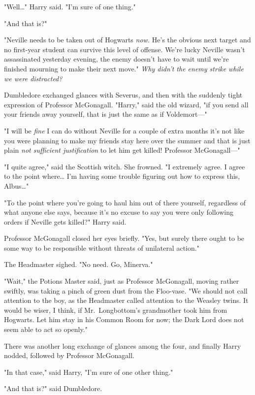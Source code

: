 "Well{\ldots}" Harry said. "I'm sure of one thing."

"And that is?"

"Neville needs to be taken out of Hogwarts \emph{now.} He's the obvious next
target and no first-year student can survive this level of offense. We're lucky
Neville wasn't assassinated yesterday evening, the enemy doesn't have to wait
until we're finished mourning to make their next move." \emph{Why didn't the
enemy strike while we were distracted?}

Dumbledore exchanged glances with Severus, and then with the suddenly tight
expression of Professor McGonagall. "Harry," said the old wizard, "if you send
all your friends away yourself, that is just the same as if Voldemort---"

"I will be \emph{fine} I can do without Neville for a couple of extra months
it's not like you were planning to make my friends stay here over the summer
and that is just plain \emph{not sufficient justification} to let him get
killed! Professor McGonagall---"

"I quite agree," said the Scottish witch. She frowned. "I extremely agree. I
agree to the point where{\ldots} I'm having some trouble figuring out how to
express this, Albus{\ldots}"

"To the point where you're going to haul him out of there yourself, regardless
of what anyone else says, because it's no excuse to say you were only following
orders if Neville gets killed?" Harry said.

Professor McGonagall closed her eyes briefly. "Yes, but surely there ought to
be some way to be responsible without threats of unilateral action."

The Headmaster sighed. "No need. Go, Minerva."

"Wait," the Potions Master said, just as Professor McGonagall, moving rather
swiftly, was taking a pinch of green dust from the Floo-vase. "We should not
call attention to the boy, as the Headmaster called attention to the Weasley
twins. It would be wiser, I think, if Mr.~Longbottom's grandmother took him
from Hogwarts. Let him stay in his Common Room for now; the Dark Lord does not
seem able to act so openly."

There was another long exchange of glances among the four, and finally Harry
nodded, followed by Professor McGonagall.

"In that case," said Harry, "I'm sure of one other thing."

"And that is?" said Dumbledore.

